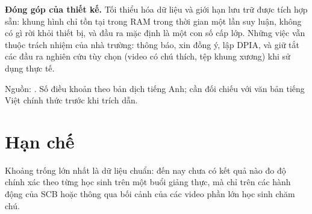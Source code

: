 \textbf{Đóng góp của thiết kế.} Tối thiểu hóa dữ liệu và giới hạn lưu trữ được tích hợp sẵn: khung hình chỉ tồn tại trong RAM trong thời gian một lần suy luận, không có gì rời khỏi thiết bị, và đầu ra mặc định là một con số cấp lớp. Những việc vẫn thuộc trách nhiệm của nhà trường: thông báo, xin đồng ý, lập DPIA, và giữ tắt các đầu ra nghiên cứu tùy chọn (video có chú thích, tệp khung xương) khi sử dụng thực tế.

Nguồn: \cite{b12,b24,b25,b26,b27}. Số điều khoản theo bản dịch tiếng Anh; cần đối chiếu với văn bản tiếng Việt chính thức trước khi trích dẫn.

\section{Hạn chế}

Khoảng trống lớn nhất là dữ liệu chuẩn: đến nay chưa có kết quả nào đo độ chính xác theo từng học sinh trên một buổi giảng thực, mà chỉ trên các hành động của SCB hoặc thông qua bối cảnh của các video phần lớn học sinh chăm chú.

